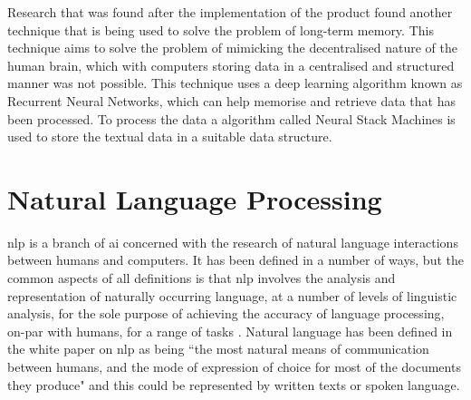 Research that was found after the implementation of the product found another technique that is being used to solve the problem of long-term memory. This technique aims to solve the problem of mimicking the decentralised nature of the human brain, which with computers storing data in a centralised and structured manner was not possible. This technique uses a deep learning algorithm known as Recurrent Neural Networks, which can help memorise and retrieve data that has been processed. To process the data a algorithm called Neural Stack Machines is used to store the textual data in a suitable data structure.
\section{Natural Language Processing} \label{section: nlp}
\gls{nlp} is a branch of \gls{ai} concerned with the research of natural language interactions between humans and computers. It has been defined in a number of ways, but the common aspects of all definitions is that \gls{nlp} involves the analysis and representation of naturally occurring language, at a number of levels of linguistic analysis, for the sole purpose of achieving the accuracy of language processing, on-par with humans, for a range of tasks \autocite{liddy2001natural}. Natural language has been defined in the white paper on \gls{nlp} as being ``the most natural means of communication between humans, and the mode of expression of choice for most of the documents they produce" \autocite{nlp-whitepaper1989} and this could be represented by written texts or spoken language.
